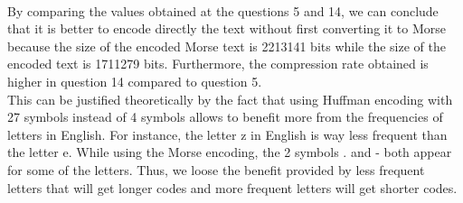 \documentclass[a4paper, 11pt, oneside]{article}
\begin{document}
\paragraph{}By comparing the values obtained at the questions 5 and 14, we can conclude that it is better to encode
directly the text without first converting it to Morse because the size of the encoded Morse text is 2213141 bits
while the size of the encoded text is 1711279 bits. Furthermore, the compression rate obtained is higher in question 14
compared to question 5.\\
This can be justified theoretically by the fact that using Huffman encoding with 27 symbols instead of 4 symbols allows to
benefit more from the frequencies of letters in English. For instance, the letter z in English is way less frequent
than the letter e. While using the Morse encoding, the 2 symbols . and - both appear for some of the letters. Thus, we
loose the benefit provided by less frequent letters that will get longer codes and more frequent letters will get shorter codes.

\end{document}
